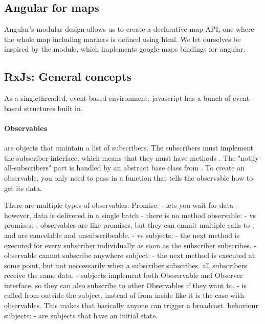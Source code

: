 \subsection{Angular for maps}
Angular's modular design allows us to create a declarative map-API, one where the whole map including markers is defined using html. We let ourselves be inspired by the  module, which implements google-maps bindings for angular. 
 



\subsection{RxJs: General concepts}

As a singlethreaded, event-based environment, javascript has a bunch of event-based structures built in.

\paragraph{Observables} are objects that maintain a list of subscribers. The subscribers must implement the subscriber-interface, which means that they must have methods .
The "notify-all-subscribers" part is handled by an abstract base class from . To create an observable, you only need to pass in a function that tells the observable how to  get its data.



There are multiple types of observables: 
Promise: 
 - lets you wait for data
 - however, data is delivered in a single batch - there is no  method
observable: 
 - vs promises: 
        - observables are like promises, but they can emmit multiple calls to , and are cancelable and unsubscribeable.
 - vs subjects: 
        - the next method is executed for every subscriber individually as soon as the subscriber subscribes. 
        - observable cannot subscribe anywhere
subject: 
 - the next method is executed at some point, but not neccessarily when a subscriber subscribes. all subscribers receive the same data. 
 - subjects implement both Obeservable and Observer interface, so they can also subscribe to other Observables if they want to. 
 -  is called from outside the subject, instead of from inside like it is the case with observables. This makes that basically anyone can trigger a broadcast. 
behaviour subjects: 
 - are subjects that have an initial state. 


